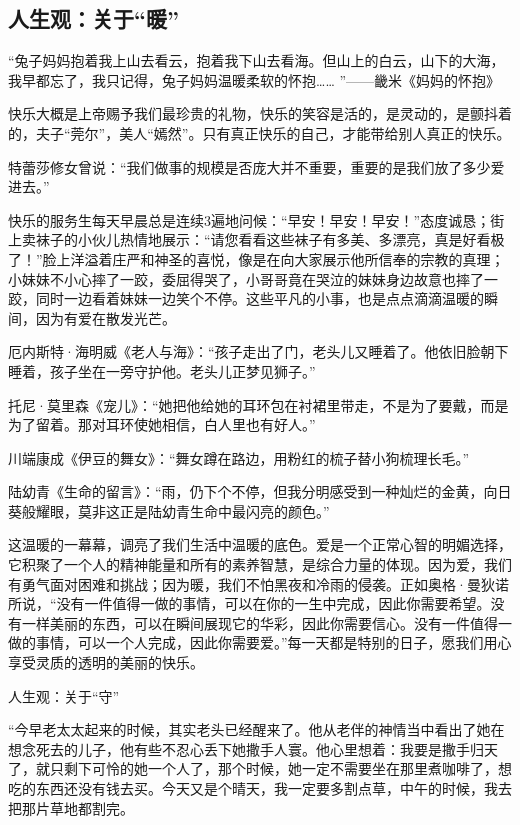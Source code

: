 \documentclass[openany,scheme = chinese, linespread = 1.5]{ctexbook}
\begin{document}
\subsection*{人生观：关于“暖”}

   “兔子妈妈抱着我上山去看云，抱着我下山去看海。但山上的白云，山下的大海，我早都忘了，我只记得，兔子妈妈温暖柔软的怀抱…… ”——畿米《妈妈的怀抱》
   
快乐大概是上帝赐予我们最珍贵的礼物，快乐的笑容是活的，是灵动的，是颤抖着的，夫子“莞尔”，美人“嫣然”。只有真正快乐的自己，才能带给别人真正的快乐。

特蕾莎修女曾说：“我们做事的规模是否庞大并不重要，重要的是我们放了多少爱进去。”

快乐的服务生每天早晨总是连续3遍地问候：“早安！早安！早安！”态度诚恳；街上卖袜子的小伙儿热情地展示：“请您看看这些袜子有多美、多漂亮，真是好看极了！”脸上洋溢着庄严和神圣的喜悦，像是在向大家展示他所信奉的宗教的真理；小妹妹不小心摔了一跤，委屈得哭了，小哥哥竟在哭泣的妹妹身边故意也摔了一跤，同时一边看着妹妹一边笑个不停。这些平凡的小事，也是点点滴滴温暖的瞬间，因为有爱在散发光芒。

厄内斯特·海明威《老人与海》：“孩子走出了门，老头儿又睡着了。他依旧脸朝下睡着，孩子坐在一旁守护他。老头儿正梦见狮子。”

托尼·莫里森《宠儿》：“她把他给她的耳环包在衬裙里带走，不是为了要戴，而是为了留着。那对耳环使她相信，白人里也有好人。”

    川端康成《伊豆的舞女》：“舞女蹲在路边，用粉红的梳子替小狗梳理长毛。”
    
    陆幼青《生命的留言》：“雨，仍下个不停，但我分明感受到一种灿烂的金黄，向日葵般耀眼，莫非这正是陆幼青生命中最闪亮的颜色。”
    
这温暖的一幕幕，调亮了我们生活中温暖的底色。爱是一个正常心智的明媚选择，它积聚了一个人的精神能量和所有的素养智慧，是综合力量的体现。因为爱，我们有勇气面对困难和挑战；因为暖，我们不怕黑夜和冷雨的侵袭。正如奥格·曼狄诺所说，“没有一件值得一做的事情，可以在你的一生中完成，因此你需要希望。没有一样美丽的东西，可以在瞬间展现它的华彩，因此你需要信心。没有一件值得一做的事情，可以一个人完成，因此你需要爱。”每一天都是特别的日子，愿我们用心享受灵质的透明的美丽的快乐。

人生观：关于“守”

   “今早老太太起来的时候，其实老头已经醒来了。他从老伴的神情当中看出了她在想念死去的儿子，他有些不忍心丢下她撒手人寰。他心里想着：我要是撒手归天了，就只剩下可怜的她一个人了，那个时候，她一定不需要坐在那里煮咖啡了，想吃的东西还没有钱去买。今天又是个晴天，我一定要多割点草，中午的时候，我去把那片草地都割完。
   
\end{document}
